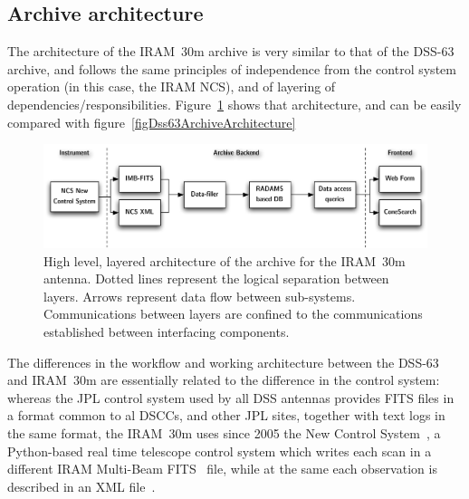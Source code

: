 		\subsection{Archive architecture} %
		\label{sub:archive_architecture_iram30}
			
			The architecture of the IRAM~30m archive is very similar
			to that of the DSS-63 archive, and follows the same
			principles of independence from the control system
			operation (in this case, the IRAM NCS), and of 
			layering of dependencies/responsibilities.
			Figure~\ref{figIramArchiveArchitecture} shows that
			architecture, and can be easily compared with
			figure~\ref{figDss63ArchiveArchitecture}
			
			\begin{figure}[tbp]
				\begin{center}
					\includegraphics[width=\textwidth]
					{fig/IRAM30m_ArchiveArchitecture.pdf}
				\end{center}
				\caption[High level, layered architecture for the
				IRAM~30m archive]
				{High level, layered architecture of the 
				archive for the IRAM~30m antenna. Dotted lines
				represent the logical separation between layers.
				Arrows represent data flow between sub-systems.
				Communications between layers are confined to the
				communications established between interfacing
				components.}
				\label{figIramArchiveArchitecture}
			\end{figure}
			
			The differences in the workflow and working
			architecture between the DSS-63 and IRAM~30m are
			essentially related to the difference in the control
			system: whereas the JPL control system used by all
			DSS antennas provides FITS files in a format common
			to al DSCCs, and other JPL sites, together with
			text logs in the same format, the IRAM~30m uses since
			2005 the New Control System~\cite{2007pako.iram..109U,
			Brunswig:2002ul, Brunswig:2004gf, Hily-Blant:2001ve,
			Perrigouard:2005rz, Ungerechts:2002hl}, a Python-based
			real time telescope control system which writes each
			scan in a different IRAM Multi-Beam
			FITS~\cite{MudPolHat0512Multi-Beam} file, while at the
			same each observation is described in an XML
			file~\cite{Brunswig:2004gf}.
			
